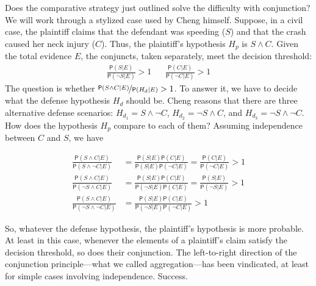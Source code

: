\documentclass[
  10pt,
  dvipsnames,enabledeprecatedfontcommands]{scrartcl}
\newcommand{\n}{\neg}
\newcommand{\et}{\wedge}
\newcommand{\pr}[1]{\ensuremath{\mathsf{P}(#1)}}
\begin{document}
Does the comparative strategy just outlined solve the difficulty with
conjunction? We will work through a stylized case used by Cheng himself.
Suppose, in a civil case, the plaintiff claims that the defendant was
speeding (\(S\)) and that the crash caused her neck injury (\(C\)).
Thus, the plaintiff's hypothesis \(H_p\) is \(S\et C\). Given the total
evidence \(E\), the conjuncts, taken separately, meet the decision
threshold: \begin{align}
 \nonumber 
 \frac{\pr{S\vert E}}{\pr{\neg S \vert E}} > 1   & & \frac{\pr{C\vert E}}{\pr{\neg C \vert E}} > 1
\end{align} \noindent The question is whether
\(\nicefrac{\pr{S\et C\vert E}}{\pr{H_d \vert E}}>1\). To answer it, we
have to decide what the defense hypothesis \(H_d\) should be. Cheng
reasons that there are three alternative defense scenarios:
\(H_{d_1}= S\et \n C\), \(H_{d_2}=\n S \et C\), and
\(H_{d_3}=\n S \et \n C\). How does the hypothesis \(H_p\) compare to
each of them? Assuming independence between \(C\) and \(S\), we have

\begin{align}\label{eq:cheng-multiplication}
\frac{\pr{S\et C\vert E}}{\pr{S\et \n C\vert E}} & = \frac{\pr{S\vert E}\pr{C\vert E}}{\pr{S \vert E}\pr{\n C \vert E}}  =\frac{\pr{C\vert E}}{\pr{\n C \vert E}} > 1 \\
\nonumber
\frac{\pr{S\et C\vert E}}{\pr{\n S\et C\vert E}} & = \frac{\pr{S\vert E}\pr{C\vert E}}{\pr{\n S \vert E}\pr{C\vert E}}  = \frac{\pr{S\vert E}}{\pr{\n S \vert E}} > 1 \\
\nonumber
\frac{\pr{S\et C\vert E}}{\pr{\n S\et \n C\vert E}} & = \frac{\pr{S\vert E}\pr{C\vert E}}{\pr{\n S \vert E}\pr{\n C \vert E}}   > 1 
\end{align}

\noindent So, whatever the defense hypothesis, the plaintiff's
hypothesis is more probable. At least in this case, whenever the
elements of a plaintiff's claim satisfy the decision threshold, so does
their conjunction. The left-to-right direction of the conjunction
principle---what we called aggregation---has been vindicated, at least
for simple cases involving independence. Success.
\end{document}
